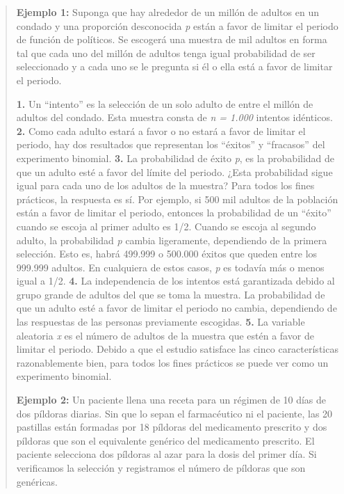 \documentclass[]{article}
\begin{document}
 \begin{quote}
 	\textbf{Ejemplo 1:} Suponga que hay alrededor de un millón de adultos en un condado y una proporción desconocida \textit{p} están a favor de limitar el periodo de función de políticos. Se escogerá una muestra de mil adultos en forma tal que cada uno del millón de adultos tenga igual probabilidad de ser seleccionado y a cada uno se le pregunta si él o ella está a favor de limitar el periodo.
 	\item \textbf{1.} Un “intento” es la selección de un solo adulto de entre el millón de adultos del condado. Esta muestra consta de \textit{n = 1.000} intentos idénticos. \newline
 	\textbf{2.} Como cada adulto estará a favor o no estará a favor de limitar el periodo, hay dos resultados que representan los “éxitos” y “fracasos” del experimento binomial. \newline
 	\textbf{3.} La probabilidad de éxito \textit{p}, es la probabilidad de que un adulto esté a favor del límite del periodo. ¿Esta probabilidad sigue igual para cada uno de los adultos de la muestra? Para todos los fines prácticos, la respuesta es sí. Por ejemplo, si 500 mil adultos de la población están a favor de limitar el periodo, entonces la probabilidad de un “éxito” cuando se escoja al primer adulto es 1/2. Cuando se escoja al segundo adulto, la probabilidad \textit{p} cambia ligeramente, dependiendo de la primera selección. Esto es, habrá 499.999 o 500.000 éxitos que queden entre los 999.999 adultos. En cualquiera de estos casos, \textit{p} es todavía más o menos igual a 1/2. \newline
 	\textbf{4.} La independencia de los intentos está garantizada debido al grupo grande de adultos del que se toma la muestra. La probabilidad de que un adulto esté a favor de limitar el periodo no cambia, dependiendo de las respuestas de las personas previamente escogidas. \newline
 	\textbf{5.} La variable aleatoria \textit{x} es el número de adultos de la muestra que estén a favor de limitar el periodo.
 	Debido a que el estudio satisface las cinco características razonablemente bien, para todos los fines prácticos se puede ver como un experimento binomial.
 	\item \textbf{Ejemplo 2:} Un paciente llena una receta para un régimen de 10 días de dos píldoras diarias. Sin que lo sepan el farmacéutico ni el paciente, las 20 pastillas están formadas por 18 píldoras del medicamento prescrito y dos píldoras que son el equivalente genérico del medicamento prescrito. El paciente selecciona dos píldoras al azar para la dosis del primer día. Si verificamos la selección y registramos el número de píldoras que son genéricas. \newline

\end{quote}
\end{document}
